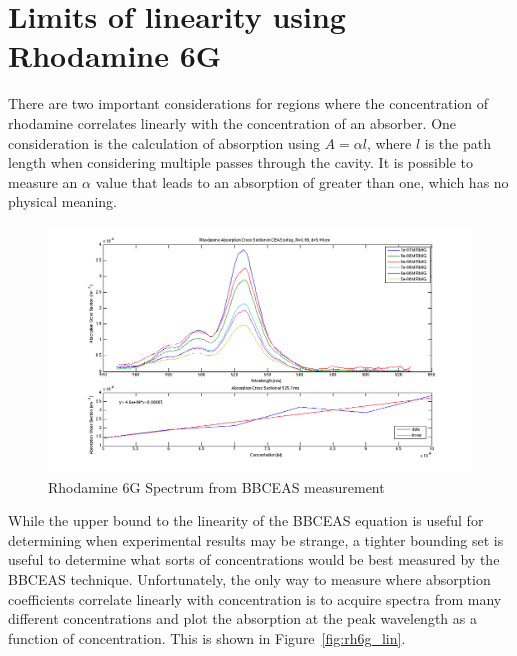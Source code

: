\section{Limits of linearity using Rhodamine 6G}\label{sec:rhodamine}

There are two important considerations for regions where the concentration of
rhodamine correlates linearly with the concentration of an absorber. One
consideration is the calculation of absorption using $A = \alpha  l$, where $l$
is the path length when considering multiple passes through the cavity.  It is
possible to measure an $\alpha$ value that leads to an absorption of greater
than one, which has no physical meaning.

\begin{figure}
\begin{center}
\includegraphics[width=\textwidth]{figures/Rh6G_absorption_cross_section_and_linearity}
\end{center}
\caption{Rhodamine 6G Spectrum from \ac{BBCEAS} measurement}
\label{fig:rh6g}
\end{figure}


While the upper bound to the linearity of the \ac{BBCEAS} equation is useful
for determining when experimental results may be strange, a tighter bounding
set is useful to determine what sorts of concentrations would be best measured
by the \ac{BBCEAS} technique. Unfortunately, the only way to measure where
absorption coefficients correlate linearly with concentration is to acquire
spectra from many different concentrations and plot the absorption at the peak
wavelength as a function of concentration.
This is shown in Figure~\ref{fig:rh6g_lin}.

